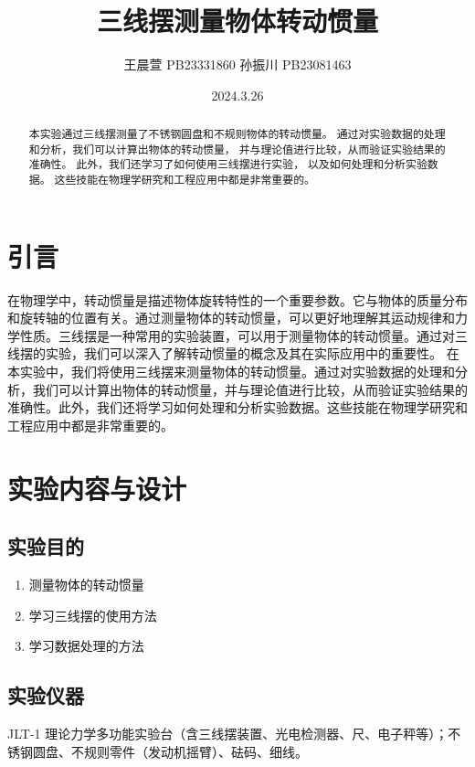 \documentclass{article}
\title{\heiti\zihao{2} 三线摆测量物体转动惯量}
\author{\songti 王晨萱 PB23331860  孙振川  PB23081463  }
\date{2024.3.26}
\begin{document}
    \maketitle
    
\begin{abstract}
    本实验通过三线摆测量了不锈钢圆盘和不规则物体的转动惯量。
    通过对实验数据的处理和分析，我们可以计算出物体的转动惯量，
    并与理论值进行比较，从而验证实验结果的准确性。
    此外，我们还学习了如何使用三线摆进行实验，
    以及如何处理和分析实验数据。
    这些技能在物理学研究和工程应用中都是非常重要的。

\end{abstract}


\section{引言}
    在物理学中，转动惯量是描述物体旋转特性的一个重要参数。它与物体的质量分布和旋转轴的位置有关。通过测量物体的转动惯量，可以更好地理解其运动规律和力学性质。三线摆是一种常用的实验装置，可以用于测量物体的转动惯量。通过对三线摆的实验，我们可以深入了解转动惯量的概念及其在实际应用中的重要性。
    在本实验中，我们将使用三线摆来测量物体的转动惯量。通过对实验数据的处理和分析，我们可以计算出物体的转动惯量，并与理论值进行比较，从而验证实验结果的准确性。此外，我们还将学习如何处理和分析实验数据。这些技能在物理学研究和工程应用中都是非常重要的。


\section{实验内容与设计}

\subsection{实验目的}
    \begin{enumerate}
        \item 测量物体的转动惯量
        \item 学习三线摆的使用方法
        \item 学习数据处理的方法
    \end{enumerate}

\subsection{实验仪器}
JLT-1 理论力学多功能实验台（含三线摆装置、光电检测器、尺、电子秤等）；不锈钢圆盘、不规则零件（发动机摇臂）、砝码、细线。
\end{document}
